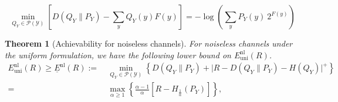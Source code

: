 \documentclass[10pt,a4paper]{amsart}
\newtheorem{theorem}{Theorem}
\newcommand{\El}{\underline{E}}
\newcommand{\mP}{\mathcal{P}}
\newcommand{\mY}{\mathcal{Y}}
\newcommand{\nl}{\mathrm{nl}}
\newcommand{\su}{\mathrm{uni}}
\begin{document}
\begin{equation}\label{cuff-minQy}
    \min_{Q_Y\in\mP(\mY)} \left[ D(Q_Y\|P_Y) - \sum_y Q_Y(y) F(y) \right]
    = -\log\left( \sum_y P_Y(y) \ 2^{F(y)} \right)
\end{equation}

\begin{theorem}[Achievability for noiseless channels]\label{thm-nl-El} For noiseless channels under the uniform formulation, we have the following lower bound on $E_\su^\nl(R)$.
    \begin{align*}
        E_\su^\nl(R) \geq \El^\nl(R)
        := \ & \min_{Q_Y\in\mP(\mY)} 
        \left\{ D(Q_Y\|P_Y) + \big| R - D(Q_Y\|P_Y) - H(Q_Y) \big|^+ \right\} \\
        = \ & \max_{\alpha\geq1} \left\{ \frac{\alpha-1}{\alpha} \left[R - H_{\frac{1}{\alpha}}(P_Y)\right] \right\},
    \end{align*}
\end{theorem}
\end{document}
